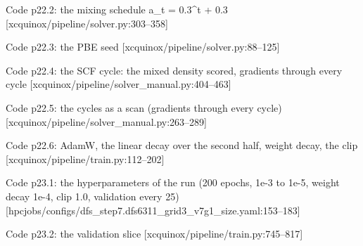 \begin{frame}[allowframebreaks]{Code p22.2: the mixing schedule a\_t = 0.3\^{}t + 0.3 [xcquinox/pipeline/solver.py:303--358]}
\label{code:p22_2_the_mixing_schedule_a_t_0_3_t_0_3}
\end{frame}
\begin{frame}[allowframebreaks]{Code p22.3: the PBE seed [xcquinox/pipeline/solver.py:88--125]}
\label{code:p22_3_the_pbe_seed}
\end{frame}
\begin{frame}[allowframebreaks]{Code p22.4: the SCF cycle: the mixed density scored, gradients through every cycle [xcquinox/pipeline/solver\_manual.py:404--463]}
\label{code:p22_4_the_scf_cycle_the_mixed_density_scored_g}
\end{frame}
\begin{frame}[allowframebreaks]{Code p22.5: the cycles as a scan (gradients through every cycle) [xcquinox/pipeline/solver\_manual.py:263--289]}
\label{code:p22_5_the_cycles_as_a_scan_gradients_through_e}
\end{frame}
\begin{frame}[allowframebreaks]{Code p22.6: AdamW, the linear decay over the second half, weight decay, the clip [xcquinox/pipeline/train.py:112--202]}
\label{code:p22_6_adamw_the_linear_decay_over_the_second_h}
\end{frame}
\begin{frame}[allowframebreaks]{Code p23.1: the hyperparameters of the run (200 epochs, 1e-3 to 1e-5, weight decay 1e-4, clip 1.0, validation every 25) [hpcjobs/configs/dfs\_step7.dfs6311\_grid3\_v7g1\_size.yaml:153--183]}
\label{code:p23_1_the_hyperparameters_of_the_run_200_epoch}
\end{frame}
\begin{frame}[allowframebreaks]{Code p23.2: the validation slice [xcquinox/pipeline/train.py:745--817]}
\label{code:p23_2_the_validation_slice}
\end{frame}
